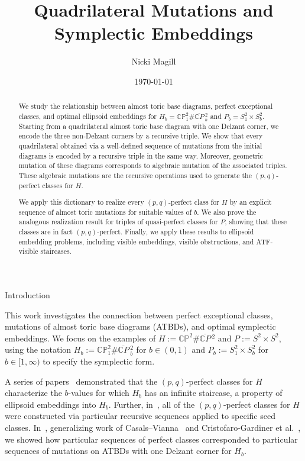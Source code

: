 \documentclass[11pt, reqno]{amsart}
\date{\today}
\title{Quadrilateral Mutations and Symplectic Embeddings}
\author{Nicki Magill}
\makeatletter
\def\section{\@startsection{section}{1}%
  \z@{.7\linespacing\@plus\linespacing}{.5\linespacing}%
  {\normalfont\Large\bfseries}}
\theoremstyle{remark}
\numberwithin{equation}{subsection}
\numberwithin{figure}{section}
\theoremstyle{customremark}
\newcommand{\oCP}{{\overline{{\C}P}}\!\,}
\newcommand{\C}{\mathbb{C}}
\newcommand{\CP}{\mathbb{CP}}
\makeatother
\begin{document}
 \begin{abstract}
We study the relationship between almost toric base diagrams, perfect
exceptional classes, and optimal ellipsoid embeddings for
$H_b=\CP^2_1 \#\oCP^2_b$ and $P_b=S^2_1\times S^2_b$.
Starting from a quadrilateral almost toric base diagram with one Delzant corner, we encode the three non-Delzant corners by a recursive triple. We show that every quadrilateral obtained via a well-defined sequence of mutations from the initial diagrams is encoded by a recursive triple in the same way. Moreover, geometric mutation of these diagrams corresponds to algebraic mutation of the associated triples. These algebraic mutations are the recursive operations used to generate the $(p,q)$-perfect classes for $H$. 

We apply this dictionary to realize every $(p,q)$-perfect class for $H$ by an explicit sequence of almost toric mutations for suitable values of $b$. We also prove the analogous realization result for triples of quasi-perfect classes for $P$, showing that these classes are in fact $(p,q)$-perfect. Finally, we apply these results to ellipsoid embedding problems, including visible embeddings, visible obstructions, and ATF-visible staircases.
\end{abstract}
\maketitle
   
    \section{Introduction}

This work investigates the connection between perfect exceptional classes, mutations of almost toric base diagrams (ATBDs), and optimal symplectic embeddings. We focus on the examples of $H := \CP^2\#\oCP^2$ and $P := S^2 \times S^2$, using the notation
$H_b := \CP^2_1\#\oCP^2_b$ for $b \in (0,1)$ and $P_b := S^2_1 \times S^2_b$ for $b \in [1,\infty)$ to specify the symplectic form. 
 
A series of papers~\cite{ICERM, MM, MMW, MPW} demonstrated that the $(p,q)$-perfect classes for $H$ characterize the $b$-values for which $H_b$ has an infinite staircase, a property of ellipsoid embeddings into $H_b$. Further, in~\cite{MMW}, all of the
$(p,q)$-perfect classes for $H$ were constructed via particular recursive sequences applied to specific seed classes. In~\cite{M1}, generalizing work of Casals--Vianna~\cite{CV}
and Cristofaro-Gardiner et al.~\cite{AADT}, we showed how particular sequences of perfect classes corresponded to particular sequences of mutations on ATBDs with one Delzant corner for $H_b$.
 
\end{document}

